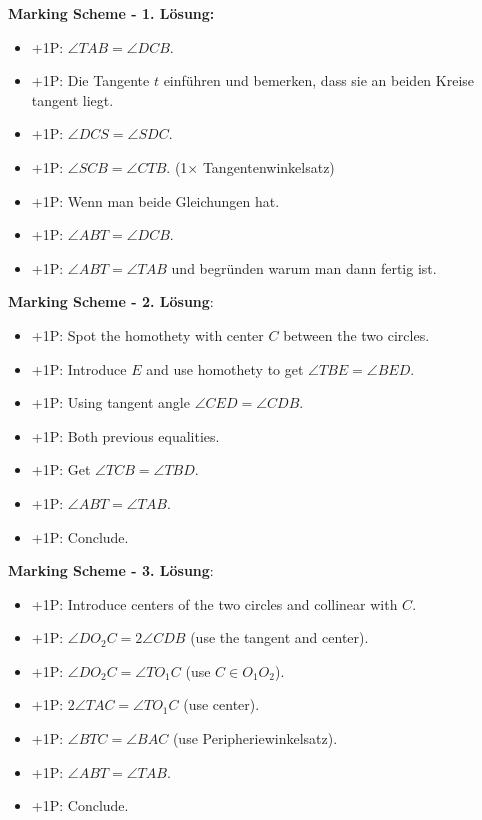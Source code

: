 \documentclass[language=german,style=solution]{smo}
\begin{document}
\begin{enumerate}
\textbf{Marking Scheme - 1. Lösung:}
\begin{itemize}
    \item +1P: $\angle TAB = \angle DCB$.
    \item +1P: Die Tangente $t$ einführen und bemerken, dass sie an beiden Kreise tangent liegt.
    \item +1P: $\angle DCS = \angle SDC$.
    \item +1P: $\angle SCB = \angle CTB$. (1$\times$ Tangentenwinkelsatz)
    \item +1P: Wenn man beide Gleichungen hat.
    \item +1P: $\angle ABT = \angle DCB$.
    \item +1P: $\angle ABT = \angle TAB$ und begründen warum man dann fertig ist.
\end{itemize}

\textbf{Marking Scheme - 2. Lösung}:
    \begin{itemize}
        \item +1P: Spot the homothety with center $C$ between the two circles. 
        \item +1P: Introduce $E$ and use homothety to get $\angle TBE=\angle BED$.
        \item +1P: Using tangent angle $\angle CED=\angle CDB$.
        \item +1P: Both previous equalities. 
        \item +1P: Get $\angle TCB=\angle TBD.$
        \item +1P: $\angle ABT = \angle TAB$.
        \item +1P: Conclude.
    \end{itemize}
    
    \newpage
\textbf{Marking Scheme - 3. Lösung}:
    \begin{itemize}
        \item +1P: Introduce centers of the two circles and collinear with $C$.
        \item +1P: $\angle DO_2C=2\angle CDB$ (use the tangent and center).
        \item +1P: $\angle DO_2C=\angle TO_1C$ (use $C\in O_1O_2$).
        \item +1P: $2\angle TAC=\angle TO_1C$ (use center).
        \item +1P: $\angle BTC=\angle BAC$ (use Peripheriewinkelsatz).
        \item +1P: $\angle ABT = \angle TAB$.
        \item +1P: Conclude.
    \end{itemize}


\end{enumerate}
\end{document}
